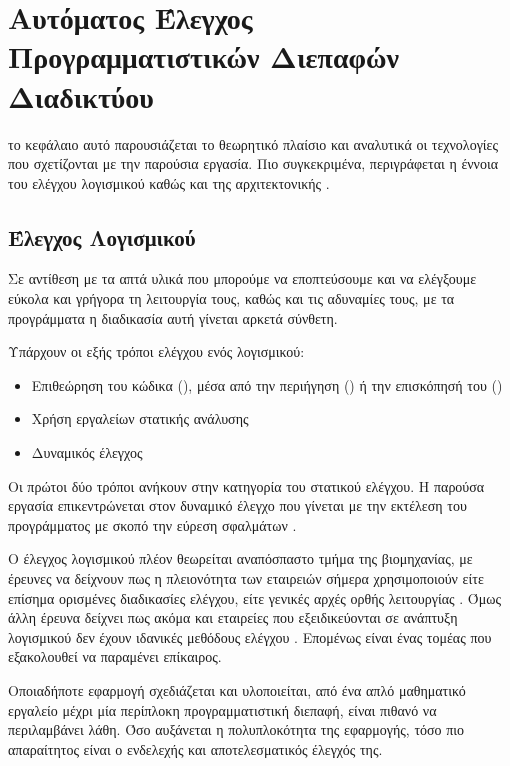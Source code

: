 \chapter{Αυτόματος Έλεγχος Προγραμματιστικών Διεπαφών Διαδικτύου}

το κεφάλαιο αυτό παρουσιάζεται το θεωρητικό πλαίσιο και αναλυτικά οι
τεχνολογίες που σχετίζονται με την παρούσια εργασία.
Πιο συγκεκριμένα, περιγράφεται η έννοια του ελέγχου λογισμικού 
καθώς και της αρχιτεκτονικής .

\section{Έλεγχος Λογισμικού}
Σε αντίθεση με τα απτά υλικά που μπορούμε να εποπτεύσουμε και να ελέγξουμε εύκολα και γρήγορα τη λειτουργία τους, καθώς και τις αδυναμίες τους,
με τα προγράμματα η διαδικασία αυτή γίνεται αρκετά σύνθετη.

Υπάρχουν οι εξής τρόποι ελέγχου ενός λογισμικού:
\begin{itemize}
    \item Επιθεώρηση του κώδικα (), μέσα από την περιήγηση () ή την επισκόπησή του () \cite{myers1978controlled}
    \item Χρήση εργαλείων στατικής ανάλυσης \cite{wichmann1995industrial}
    \item Δυναμικός έλεγχος
\end{itemize}

Οι πρώτοι δύο τρόποι ανήκουν στην κατηγορία του στατικού ελέγχου.
Η παρούσα εργασία επικεντρώνεται στον δυναμικό έλεγχο που γίνεται με την εκτέλεση του προγράμματος με σκοπό την εύρεση σφαλμάτων \cite{ball1999concept}\cite{myers2004art}.

Ο έλεγχος λογισμικού πλέον θεωρείται αναπόσπαστο τμήμα της βιομηχανίας,
με έρευνες να δείχνουν πως η πλειονότητα των εταιρειών σήμερα χρησιμοποιούν είτε επίσημα ορισμένες διαδικασίες ελέγχου,
είτε γενικές αρχές ορθής λειτουργίας \cite{article2010}.
Όμως άλλη έρευνα δείχνει πως ακόμα και εταιρείες που εξειδικεύονται σε ανάπτυξη λογισμικού δεν έχουν ιδανικές μεθόδους ελέγχου \cite{articleMaz}.
Επομένως είναι ένας τομέας που εξακολουθεί να παραμένει επίκαιρος.

Οποιαδήποτε εφαρμογή σχεδιάζεται και υλοποιείται,
από ένα απλό μαθηματικό εργαλείο μέχρι μία περίπλοκη προγραμματιστική διεπαφή,
είναι πιθανό να περιλαμβάνει λάθη.
Όσο αυξάνεται η πολυπλοκότητα της εφαρμογής, τόσο πιο απαραίτητος είναι ο ενδελεχής και αποτελεσματικός έλεγχός της. 
